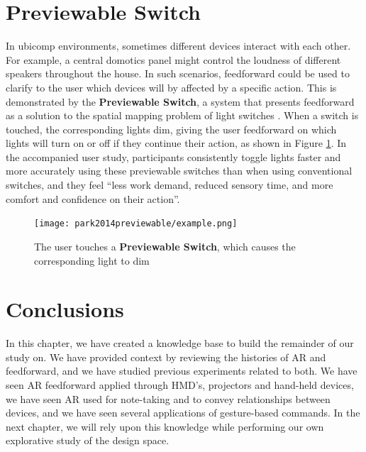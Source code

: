 \section{Previewable Switch} \label{sec:relat:previewable_switch}
In ubicomp environments, sometimes different devices interact with each other. For example, a central domotics panel might control the loudness of different speakers throughout the house. In such scenarios, feedforward could be used to clarify to the user which devices will by affected by a specific action. This is demonstrated by the \textbf{Previewable Switch}, a system that presents feedforward as a solution to the spatial mapping problem of light switches \cite{park2014previewable}. When a switch is touched, the corresponding lights dim, giving the user feedforward on which lights will turn on or off if they continue their action, as shown in Figure \ref{fig:park2014previewable_demo}. In the accompanied user study, participants consistently toggle lights faster and more accurately using these previewable switches than when using conventional switches, and they feel ``less work demand, reduced sensory time, and more comfort and confidence on their action''.

\begin{figure}
    \centering
    \texttt{[image: park2014previewable/example.png]}
    \caption{The user touches a \textbf{Previewable Switch}, which causes the corresponding light to dim \cite{park2014previewable}}
    \label{fig:park2014previewable_demo}
\end{figure}

\section{Conclusions} \label{sec:relat:concl}
In this chapter, we have created a knowledge base to build the remainder of our study on. We have provided context by reviewing the histories of AR and feedforward, and we have studied previous experiments related to both. We have seen AR feedforward applied through HMD's, projectors and hand-held devices, we have seen AR used for note-taking and to convey relationships between devices, and we have seen several applications of gesture-based commands. In the next chapter, we will rely upon this knowledge while performing our own explorative study of the design space.


